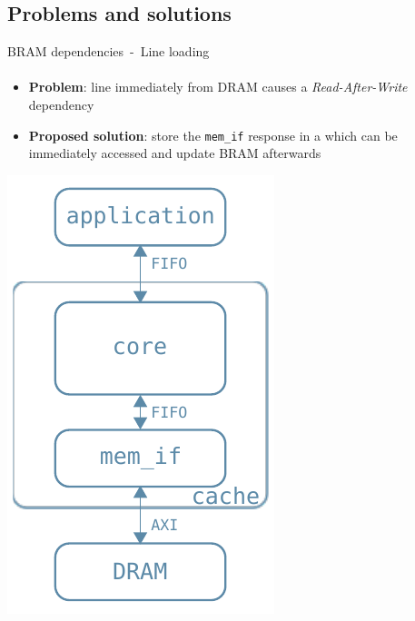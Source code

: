 \documentclass[handout,aspectratio=169]{beamer}
\begin{document}
\subsection{Problems and solutions}
\begin{frame}{BRAM dependencies~-~Line loading}
	\framesubtitle{}
	\begin{minipage}{.7\textwidth}
		\begin{itemize}[<+->]
			\item \textbf{Problem}:
				 line immediately
				 from DRAM
				causes a \emph{Read-After-Write} dependency
			\item \textbf{Proposed solution}:
				store the \texttt{mem\_if} response in a
				 which can be immediately
				accessed and update BRAM afterwards
		\end{itemize}
	\end{minipage}
	\begin{minipage}{.28\textwidth}
		\begin{center}
			\includegraphics[width=.8\textwidth]{internal_arch.pdf}
		\end{center}
	\end{minipage}
\end{frame}
\end{document}

